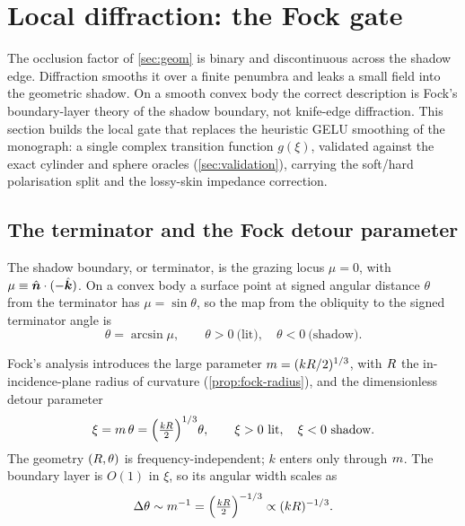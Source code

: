 \section{Local diffraction: the Fock gate}\label{sec:fock-local}

The occlusion factor of \cref{sec:geom} is binary and discontinuous across the
shadow edge. Diffraction smooths it over a finite penumbra and leaks a small
field into the geometric shadow. On a smooth convex body the correct description
is Fock's boundary-layer theory of the shadow boundary, not knife-edge
diffraction. This section builds the local gate that replaces the heuristic GELU
smoothing of the monograph: a single complex transition function $g(\xi)$,
validated against the exact cylinder and sphere oracles
(\cref{sec:validation}), carrying the soft/hard polarisation split and the
lossy-skin impedance correction.

\subsection{The terminator and the Fock detour parameter}\label{sec:fock-xi}

The shadow boundary, or terminator, is the grazing locus $\mu=0$, with
$\mu\equiv\hat{\bm{n}}\cdot(-\hat{\bm{k}})$. On a convex body a surface point at signed angular
distance $\theta$ from the terminator has $\mu=\sin\theta$, so the map from the
obliquity to the signed terminator angle is
\begin{equation}\label{eq:theta-mu}
  \theta = \arcsin\mu, \qquad
  \theta>0 \ \text{(lit)}, \quad \theta<0 \ \text{(shadow)}.
\end{equation}

Fock's analysis introduces the large parameter $m=(kR/2)^{1/3}$, with
$R$ the in-incidence-plane radius of curvature
(\cref{prop:fock-radius}), and the dimensionless detour parameter
\begin{equation}\label{eq:fock-xi}
  \xi = m\,\theta = \Bigl(\tfrac{kR}{2}\Bigr)^{1/3}\theta,
  \qquad \xi>0 \ \text{lit}, \quad \xi<0 \ \text{shadow}.
\end{equation}
The geometry $(R,\theta)$ is frequency-independent; $k$ enters only through
$m$. The boundary layer is $O(1)$ in $\xi$, so its angular width scales as
\begin{equation}\label{eq:fock-width}
  \Delta\theta \sim m^{-1} = \Bigl(\tfrac{kR}{2}\Bigr)^{-1/3}
  \propto (kR)^{-1/3}.
\end{equation}

